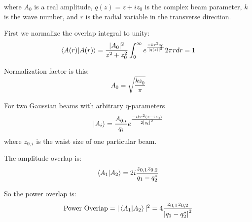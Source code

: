 \documentclass[oneside]{book}
\begin{document}
\begin{appendices}
	where $A_0$ is a real amplitude, $q(z)= z + i z_0$ is the complex beam parameter, $k$ is the wave number, and $r$ is the radial variable in the transverse direction.

	First we normalize the overlap integral to unity:
	\begin{equation}
	\braket{A(r)|A(r)} 
	=  \frac{\rvert A_0 \rvert^2}{z^2+z_0^2} \int_{0}^{\infty} e^{\frac{-kr^2 z_0}{\abs{q(z)}^2}} 2 \pi r dr = 1
	\end{equation}

	Normalization factor is this:
	\begin{equation}
	A_0 = \sqrt{\frac{k z_0}{\pi}}
	\end{equation}

	For two Gaussian beams with arbitrary q-parameters
	\begin{equation}
	\ket{A_i} = \frac{A_{0,i}}{q_i} e^{ \frac{-ikr^2(z-iz_0)}{2\abs{q_i}^2 }}
	\end{equation}
	where $z_{0,i}$ is the waist size of one particular beam.
	
	The amplitude overlap is:
	\begin{equation}
	\braket{A_1|A_2} = 2 i  \frac{ z_{0,1}z_{0,2}}{q_1 - q_2^*}
	\end{equation}
	
	So the power overlap is:
	\begin{equation}
	\text{Power Overlap} = \vert \braket{A_1|A_2} \vert^2 = 4 \frac{ z_{0,1}z_{0,2}}{\abs{q_1 - q_2^*}^2}
	\end{equation}

\end{appendices} 

\medskip



\end{document}
